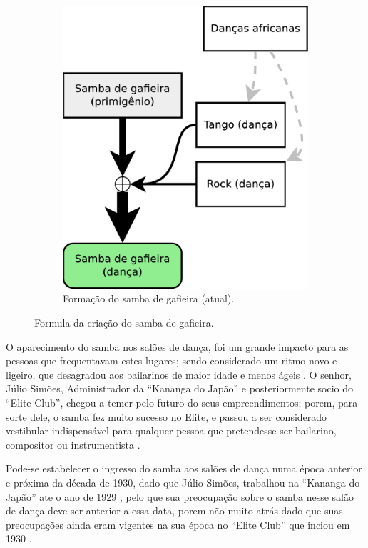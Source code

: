 \begin{figure}[h]
\begin{subfigure}[b]{0.37\textwidth}
    \includegraphics[width=\textwidth]{chapters/cap-historia-sambagafieira/sambagafieiraformula2.eps}
    \caption{Formação do samba de gafieira (atual).}
    \label{fig:formuladosambagafieira2}
  \end{subfigure}
\caption{Formula da criação do samba de gafieira.}
\label{fig:formuladosambagafieiraall}
\end{figure}


O aparecimento do samba nos salões de dança, 
foi um grande impacto para as pessoas que frequentavam estes lugares;
sendo considerado um ritmo novo e ligeiro,
que desagradou aos bailarinos de maior idade e menos ágeis \cite[pp. 6 - cad. B]{entrevistajuliojournalbrasil1}.
O senhor, Júlio Simões, Administrador da ``Kananga do Japão'' e posteriormente socio
do ``Elite Club'', chegou a temer pelo futuro do seus empreendimentos; porem, para sorte dele, 
o samba fez muito sucesso no Elite,
e passou a ser considerado vestibular indispensável para qualquer pessoa que pretendesse ser bailarino, 
compositor ou instrumentista \cite[pp. 6 - cad. B]{entrevistajuliojournalbrasil1}.

Pode-se estabelecer o ingresso do samba aos salões de dança numa época anterior e próxima da década de 1930,
dado que Júlio Simões, trabalhou na ``Kananga do Japão'' ate o ano de 1929 \cite[pp. 3 - cad. 3]{juliosimoes}  
\cite[pp. 11]{eliteinaugura} \cite[pp. 1 - cad. B]{gafieira2000reis}, pelo que sua preocupação sobre o samba 
nesse salão de dança deve ser anterior a essa data, porem não muito atrás dado que 
suas preocupações ainda eram vigentes na sua época no ``Elite Club'' 
que inciou em 1930 \cite[pp. 11]{eliteinaugura} \cite[pp. 3 - cad. 3]{juliosimoes} \cite[pp. 10]{simoesjournalbrasil1}.

